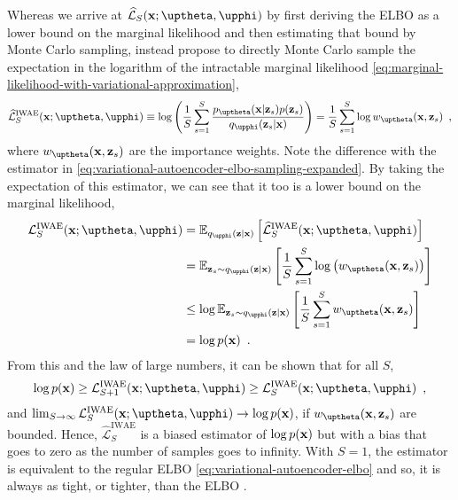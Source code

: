 Whereas we arrive at $\widehat{\mathcal{L}}_{S}(\xb;\thetab,\phib)$ by first deriving the ELBO as a lower bound on the marginal likelihood and then estimating that bound by Monte Carlo sampling, \textcite{burda_importance_2016} instead propose to directly Monte Carlo sample the expectation in the logarithm of the intractable marginal likelihood \cref{eq:marginal-likelihood-with-variational-approximation},
%
\begin{equation}
    \widehat{\mathcal{L}}^{\text{IWAE}}_{S}(\xb;\thetab,\phib) \equiv \log \left( \frac{1}{S}\sum_{s=1}^{S} \frac{p_\thetab(\xb|\zb_{s})p(\zb_{s})}{q_\phib(\zb_{s}|\xb)} \right) = \frac{1}{S} \sum_{s=1}^S \log w_\thetab(\xb,\zb_{s}) \enspace ,
\end{equation}
%
where $w_\thetab(\xb,\zb_{s})$ are the importance weights. Note the difference with the estimator in \cref{eq:variational-autoencoder-elbo-sampling-expanded}. 
By taking the expectation of this estimator, we can see that it too is a lower bound on the marginal likelihood,
%
\begin{align}
    \mathcal{L}^{\text{IWAE}}_{S}(\xb;\thetab,\phib)
    &= \mathbb{E}_{q_\phib(\zb|\xb)}\left[ \widehat{\mathcal{L}}^{\text{IWAE}}_{S}(\xb;\thetab,\phib) \right] \nonumber \\
    &= \mathbb{E}_{\zb_{s}\sim q_\phib(\zb|\xb)}\left[ \frac{1}{S}\sum_{s=1}^{S} \log \left( w_\thetab(\xb,\zb_{s}) \right) \right] \nonumber \\
    &\leq \log \mathbb{E}_{\zb_{s}\sim q_\phib(\zb|\xb)}\left[ \frac{1}{S}\sum_{s=1}^{S} w_\thetab(\xb,\zb_{s}) \right] \nonumber \\
    &= \log p(\xb) \enspace .
\end{align}
%
From this and the law of large numbers, it can be shown that for all $S$,
%
\begin{equation}
    \log p(\xb) \geq \mathcal{L}^{\text{IWAE}}_{S+1}(\xb;\thetab,\phib) \geq \mathcal{L}^{\text{IWAE}}_{S}(\xb;\thetab,\phib) \enspace ,
\end{equation}
%
and $\lim_{S\rightarrow\infty} \mathcal{L}^{\text{IWAE}}_{S}(\xb;\thetab,\phib) \rightarrow \log p(\xb)$, if $w_\thetab(\xb,\zb_{s})$ are bounded. 
Hence, $\widehat{\mathcal{L}}^{\text{IWAE}}_{S}$ is a biased estimator of $\log p({\mathbf{x}})$ but with a bias that goes to zero as the number of samples goes to infinity. 
With $S=1$, the estimator is equivalent to the regular ELBO \cref{eq:variational-autoencoder-elbo} and so, it is always as tight, or tighter, than the ELBO \parencite{burda_importance_2016}.


